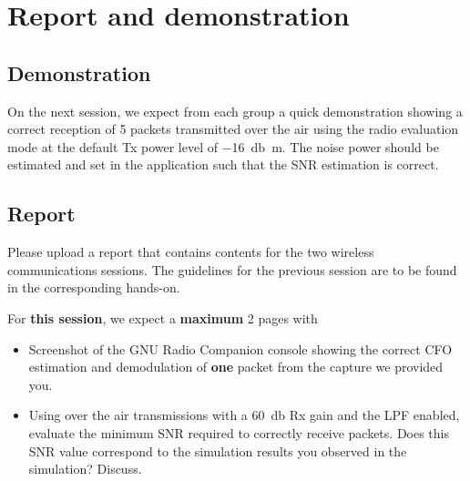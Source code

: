 \section{Report and demonstration}

\subsection{Demonstration}

On the next session, we expect from each group a quick demonstration showing a correct reception of 5 packets transmitted over the air using the radio evaluation mode
at the default Tx power level of \SI{-16}{\decibel\meter}. The noise power should be estimated and set in the application such that the SNR estimation is correct.

\subsection{Report}

Please upload a report that contains contents for the two wireless communications sessions.
The guidelines for the previous session are to be found in the corresponding hands-on.

For \textbf{this session}, we expect a \textbf{maximum} 2 pages with
\begin{itemize}
    \item Screenshot of the GNU Radio Companion console showing the correct CFO estimation and demodulation of \textbf{one} packet from the capture we provided you.
    \item Using over the air transmissions with a \SI{60}{\decibel} Rx gain and the LPF enabled, evaluate the minimum SNR required to correctly receive packets.
    Does this SNR value correspond to the simulation results you observed in the simulation? Discuss.
\end{itemize}
